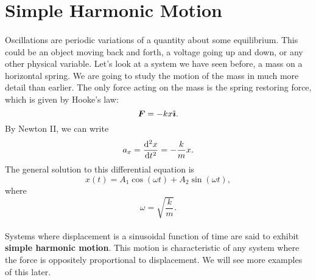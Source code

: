\documentclass[../classical_mechanics.tex]{subfiles}
\begin{document}
    \section{Simple Harmonic Motion}\label{sec:simple-harmonic-motion}
        \paragraph{}
        Oscillations are periodic variations of a quantity about some equilibrium.
        This could be an object moving back and forth, a voltage going up and down, or any other physical variable.
        Let's look at a system we have seen before, a mass on a horizontal spring.
        We are going to study the motion of the mass in much more detail than earlier.
        The only force acting on the mass is the spring restoring force, which is given by Hooke's law:
        \begin{equation}
            \boldsymbol{F}=-kx\hat{\boldsymbol{\imath}}.
        \end{equation}
        By Newton II, we can write
        \begin{equation}\label{eq:SHM-spring}
            a_x=\dv[2]{x}{t}=-\frac{k}{m}x.
        \end{equation}
        The general solution to this differential equation is
        \begin{equation}
            x(t)=A_1\cos(\omega t)+A_2\sin(\omega t),
        \end{equation}
        where
        \begin{equation}
            \omega=\sqrt{\frac{k}{m}}.
        \end{equation}

        \paragraph{}
        Systems where displacement is a sinusoidal function of time are said to exhibit \textbf{simple harmonic motion}.
        This motion is characteristic of any system where the force is oppositely proportional to displacement.
        We will see more examples of this later.
\end{document}
